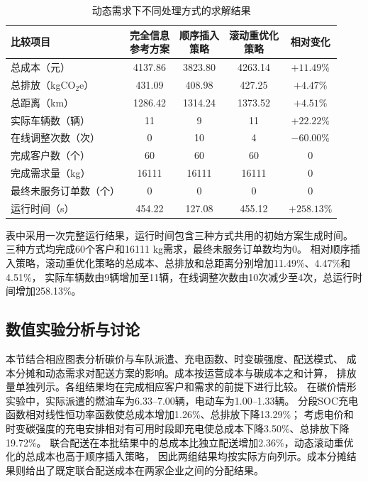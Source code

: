 \documentclass{setp-new}
\newcommand{\setptabsetup}{\small\renewcommand{\arraystretch}{0.95}\setlength{\tabcolsep}{2.2pt}\hbadness=10000}
\begin{document}
\begin{table}[H]
  \centering
  \caption{动态需求下不同处理方式的求解结果}
  \label{tab:dynamic}
  \setptabsetup
  \begin{tabular*}{\linewidth}{@{\extracolsep{\fill}}lcccc@{}}
    \toprule
    比较项目 & \makecell{完全信息\\参考方案} & \makecell{顺序插入\\策略} & \makecell{滚动重优化\\策略} & 相对变化\\
    \midrule
    总成本（元） & 4137.86 & 3823.80 & 4263.14 & $+11.49\%$\\
    总排放（kgCO$_2$e） & 431.09 & 408.98 & 427.25 & $+4.47\%$\\
    总距离（km） & 1286.42 & 1314.24 & 1373.52 & $+4.51\%$\\
    实际车辆数（辆） & 11 & 9 & 11 & $+22.22\%$\\
    在线调整次数（次） & 0 & 10 & 4 & $-60.00\%$\\
    完成客户数（个） & 60 & 60 & 60 & 0\\
    完成需求量（kg） & 16111 & 16111 & 16111 & 0\\
    最终未服务订单数（个） & 0 & 0 & 0 & 0\\
    运行时间（s） & 454.22 & 127.08 & 455.12 & $+258.13\%$\\
    \bottomrule
  \end{tabular*}
\end{table}

表中采用一次完整运行结果，运行时间包含三种方式共用的初始方案生成时间。
三种方式均完成60个客户和16111 kg需求，最终未服务订单数均为0。
相对顺序插入策略，滚动重优化策略的总成本、总排放和总距离分别增加11.49\%、4.47\%和4.51\%，
实际车辆数由9辆增加至11辆，在线调整次数由10次减少至4次，总运行时间增加258.13\%。

\subsection{数值实验分析与讨论}

本节结合相应图表分析碳价与车队派遣、充电函数、时变碳强度、配送模式、
成本分摊和动态需求对配送方案的影响。成本按运营成本与碳成本之和计算，
排放量单独列示。各组结果均在完成相应客户和需求的前提下进行比较。
在碳价情形实验中，实际派遣的燃油车为6.33--7.00辆，电动车为1.00--1.33辆。
分段SOC充电函数相对线性恒功率函数使总成本增加1.26\%、总排放下降13.29\%；
考虑电价和时变碳强度的充电安排相对有可用时段即充电使总成本下降3.50\%、总排放下降19.72\%。
联合配送在本批结果中的总成本比独立配送增加2.36\%，动态滚动重优化的总成本也高于顺序插入策略，
因此两组结果均按实际方向列示。成本分摊结果则给出了既定联合配送成本在两家企业之间的分配结果。
\end{document}
